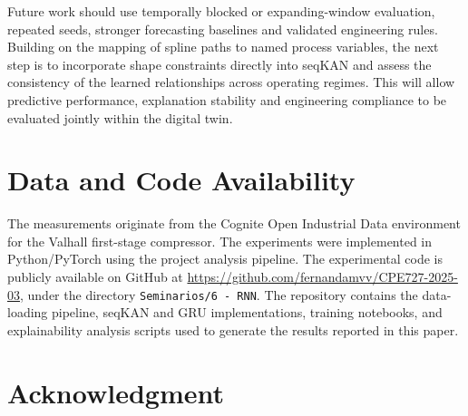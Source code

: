 \documentclass[conference]{IEEEtran}
\begin{document}
Future work should use temporally blocked or expanding-window
evaluation, repeated seeds, stronger forecasting baselines and
validated engineering rules. Building on the mapping of spline
paths to named process variables, the next step is to incorporate
shape constraints directly into seqKAN and assess the consistency
of the learned relationships across operating regimes. This will
allow predictive performance, explanation stability and engineering
compliance to be evaluated jointly within the digital twin.

\section*{Data and Code Availability}
The measurements originate from the Cognite Open Industrial Data environment for the Valhall first-stage compressor. The experiments were implemented in Python/PyTorch using the project analysis pipeline. The experimental code is publicly available on GitHub at \url{https://github.com/fernandamvv/CPE727-2025-03}, under the directory \texttt{Seminarios/6 - RNN}. The repository contains the data-loading pipeline, seqKAN and GRU implementations, training notebooks, and explainability analysis scripts used to generate the results reported in this paper.

\section*{Acknowledgment}
\end{document}
